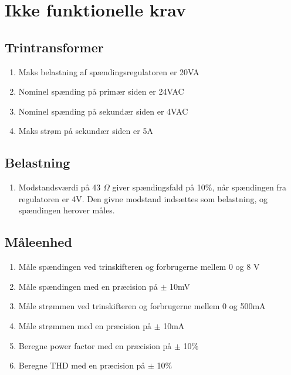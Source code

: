 
\section{Ikke funktionelle krav}

\subsection{Trintransformer}
\begin{enumerate}
	\item Maks belastning af spændingsregulatoren er 20VA
	\item Nominel spænding på primær siden er 24VAC
	\item Nominel spænding på sekundær siden er 4VAC
	\item Maks strøm på sekundær siden er 5A	
\end{enumerate}

\subsection{Belastning}
\begin{enumerate}
	\item Modstandsværdi på 43 $\Omega$ giver spændingsfald på 10\%, når spændingen fra regulatoren er 4V. Den givne modstand indsættes som belastning, og spændingen herover måles.
\end{enumerate}

\subsection{Måleenhed}
\begin{enumerate}
	\item Måle spændingen ved trinskifteren og forbrugerne mellem 0 og 8 V
	\item Måle spændingen med en præcision på $\pm$ 10mV
	\item Måle strømmen ved trinskifteren og forbrugerne mellem 0 og 500mA
	\item Måle strømmen med en præcision på $\pm$ 10mA 
	\item Beregne power factor med en præcision på $\pm$ 10$\%$
	\item Beregne THD med en præcision på $\pm$ 10$\%$
\end{enumerate}


